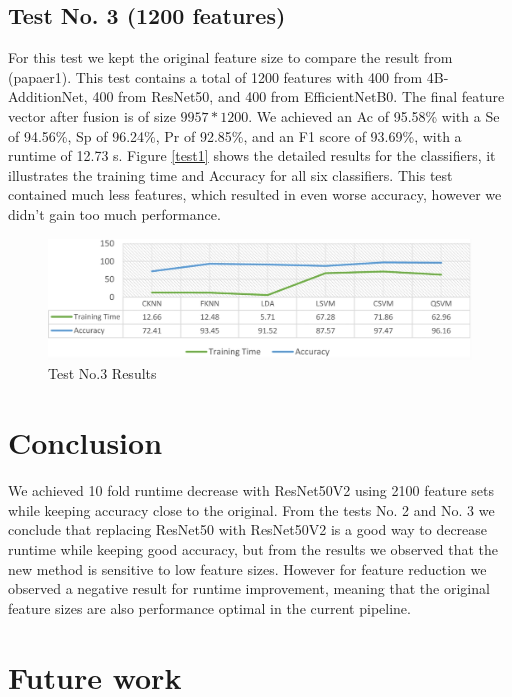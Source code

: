 \documentclass[conference]{IEEEtran}
\begin{document}
\subsection{Test No. 3 (1200 features)}

For this test we kept the original feature size to compare the result from (papaer1).
This test contains a total of 1200 features with 400 from 4B-AdditionNet, 400 from ResNet50, and 400 from EfficientNetB0. 
The final feature vector after fusion is of size $9957*1200$.
We achieved an Ac of 95.58\% with a Se of 94.56\%, Sp of 96.24\%, Pr of 92.85\%, and an F1 score of 93.69\%, with a runtime of 12.73 s. 
Figure \ref{test1} shows the detailed results for the classifiers, it illustrates the training time and Accuracy for all six classifiers.
This test contained much less features, which resulted in even worse accuracy, however we didn't gain too much performance.

\begin{figure}[htbp]
    \begin{center}
    \includegraphics[scale=0.25]{test3.png}
    \end{center}
    \caption{Test No.3 Results}
    \label{test3}
\end{figure}

\section{Conclusion}

We achieved 10 fold runtime decrease with ResNet50V2 using 2100 feature sets while keeping accuracy close to the original.
From the tests No. 2 and No. 3 we conclude that replacing ResNet50 with ResNet50V2 is a good way to decrease runtime while keeping good accuracy, but from the results we observed that the new method is sensitive to low feature sizes.
However for feature reduction we observed a negative result for runtime improvement, meaning that the original feature sizes are also performance optimal in the current pipeline.

\section{Future work}
\end{document}
